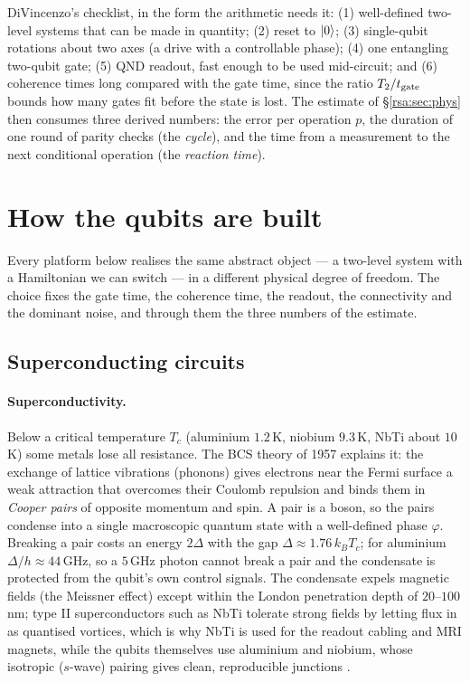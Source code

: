 \begin{keybox}[title={What a circuit asks of the physics}]
DiVincenzo's checklist, in the form the arithmetic needs it: (1) well-defined two-level systems
that can be made in quantity; (2) reset to $\lvert 0 \rangle$; (3) single-qubit rotations about two axes
(a drive with a controllable phase); (4) one entangling two-qubit gate; (5) QND readout, fast
enough to be used mid-circuit; and (6) coherence times long compared with the gate time, since
the ratio $T_2/t_{\rm gate}$ bounds how many gates fit before the state is lost. The estimate of
\S\ref{rsa:sec:phys} then consumes three derived numbers: the error per operation $p$, the
duration of one round of parity checks (the \emph{cycle}), and the time from a measurement to
the next conditional operation (the \emph{reaction time}).
\end{keybox}

\section{How the qubits are built}\label{ph:sec:hw}

Every platform below realises the same abstract object --- a two-level system with a Hamiltonian
we can switch --- in a different physical degree of freedom. The choice fixes the gate time, the
coherence time, the readout, the connectivity and the dominant noise, and through them the three
numbers of the estimate.

\subsection{Superconducting circuits}\label{ph:sec:sc}

\paragraph{Superconductivity.} Below a critical temperature $T_c$ (aluminium $1.2$\,K, niobium
$9.3$\,K, NbTi about $10$\,K) some metals lose all resistance. The BCS theory of 1957 explains
it: the exchange of lattice vibrations (phonons) gives electrons near the Fermi surface a weak
attraction that overcomes their Coulomb repulsion and binds them in \emph{Cooper pairs} of
opposite momentum and spin. A pair is a boson, so the pairs condense into a single macroscopic
quantum state with a well-defined phase $\varphi$. Breaking a pair costs an energy $2\Delta$ with
the gap $\Delta\approx1.76\,k_BT_c$; for aluminium $\Delta/h\approx44$\,GHz, so a $5$\,GHz photon
cannot break a pair and the condensate is protected from the qubit's own control signals. The
condensate expels magnetic fields (the Meissner effect) except within the London penetration depth
of $20$--$100$\,nm; type II superconductors such as NbTi tolerate strong fields by letting flux in
as quantised vortices, which is why NbTi is used for the readout cabling and MRI magnets, while the
qubits themselves use aluminium and niobium, whose isotropic ($s$-wave) pairing gives clean,
reproducible junctions \cite{ph:uqt26}.


